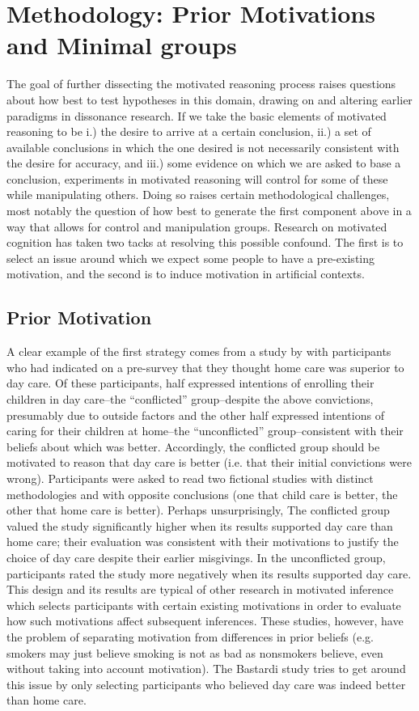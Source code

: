 \documentclass{article}
\begin{document}
\section{Methodology: Prior Motivations and Minimal groups}
The goal of further dissecting the motivated reasoning process raises questions about how best to test hypotheses in this domain, drawing on and altering earlier paradigms in dissonance research. If we take the basic elements of motivated reasoning to be i.) the desire to arrive at a certain conclusion, ii.) a set of available conclusions in which the one desired is not necessarily consistent with the desire for accuracy, and iii.) some evidence on which we are asked to base a conclusion, experiments in motivated reasoning will control for some of these while manipulating others. Doing so raises certain methodological challenges, most notably the question of how best to generate the first component above in a way that allows for control and manipulation groups. Research on motivated cognition has taken two tacks at resolving this possible confound. The first is to select an issue around which we expect some people to have a pre-existing motivation, and the second is to induce motivation in artificial contexts. 
\subsection{Prior Motivation}
A clear example of the first strategy comes from a study by \citet{Bastardi2011} with participants who had indicated on a pre-survey that they thought home care was superior to day care. Of these participants, half expressed intentions of enrolling their children in day care--the ``conflicted'' group--despite the above convictions, presumably due to outside factors and the other half expressed intentions of caring for their children at home--the ``unconflicted'' group--consistent with their beliefs about which was better. Accordingly, the conflicted group should be motivated to reason that day care is better (i.e. that their initial convictions were wrong). Participants were asked to read two fictional studies with distinct methodologies and with opposite conclusions (one that child care is better, the other that home care is better). Perhaps unsurprisingly, The conflicted group valued the study significantly higher when its results supported day care than home care; their evaluation was consistent with their motivations to justify the choice of day care despite their earlier misgivings. In the unconflicted group, participants rated the study more negatively when its results supported day care. This design and its results are typical of other research in motivated inference which selects participants with certain existing motivations in order to evaluate how such motivations affect subsequent inferences. These studies, however, have the problem of separating motivation from differences in prior beliefs (e.g. smokers may just believe smoking is not as bad as nonsmokers believe, even without taking into account motivation). The Bastardi study tries to get around this issue by only selecting participants who believed day care was indeed better than home care.
\end{document}
